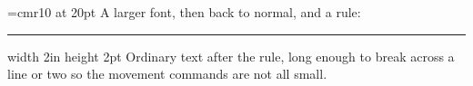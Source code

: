 \hsize=4in
\font\big=cmr10 at 20pt
\big A larger font, then \rm back to normal, and a rule:
\hrule width 2in height 2pt
\vskip 12pt
Ordinary text after the rule, long enough to break across a line or two so the
movement commands are not all small.
\bye
